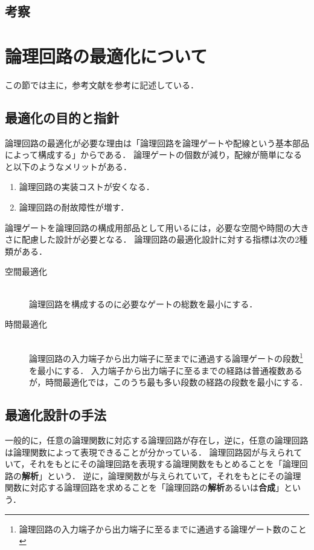 \documentclass[uplatex]{jsarticle}
\begin{document}
\subsection{考察}

\clearpage

\section{論理回路の最適化について}

この節では主に，参考文献\cite{siba}を参考に記述している．

\subsection{最適化の目的と指針}

論理回路の最適化が必要な理由は「論理回路を論理ゲートや配線という基本部品によって構成する」からである．
論理ゲートの個数が減り，配線が簡単になると以下のようなメリットがある．

\begin{enumerate}
  \item 論理回路の実装コストが安くなる．
  \item 論理回路の耐故障性が増す．
\end{enumerate}

論理ゲートを論理回路の構成用部品として用いるには，必要な空間や時間の大きさに配慮した設計が必要となる．
論理回路の最適化設計に対する指標は次の2種類がある．

\begin{description}
 \item[空間最適化]\mbox{}\\
   論理回路を構成するのに必要なゲートの総数を最小にする．
 \item[時間最適化]\mbox{}\\
  論理回路の入力端子から出力端子に至までに通過する論理ゲートの段数\footnote{論理回路の入力端子から出力端子に至るまでに通過する論理ゲート数のこと}を最小にする．
  入力端子から出力端子に至るまでの経路は普通複数あるが，時間最適化では，このうち最も多い段数の経路の段数を最小にする．
\end{description}

\subsection{最適化設計の手法}

一般的に，任意の論理関数に対応する論理回路が存在し，逆に，任意の論理回路は論理関数によって表現できることが分かっている．
論理回路図が与えられていて，それをもとにその論理回路を表現する論理関数をもとめることを「論理回路の{\bf 解析}」という．
逆に，論理関数が与えられていて，それをもとにその論理関数に対応する論理回路を求めることを「論理回路の{\bf 解析}あるいは{\bf 合成}」という．
\end{document}
